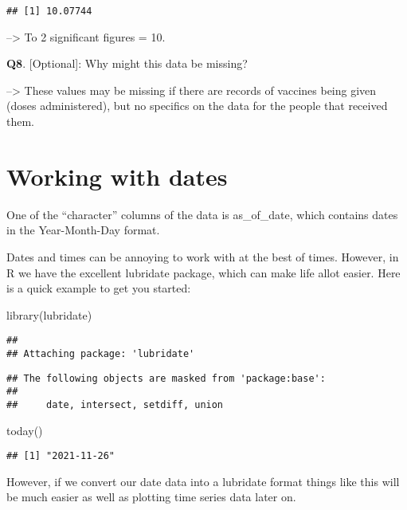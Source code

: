 \documentclass[
]{article}
\newenvironment{Shaded}{\begin{snugshade}}{\end{snugshade}}
\newcommand{\FunctionTok}[1]{\textcolor[rgb]{0.00,0.00,0.00}{#1}}
\newcommand{\NormalTok}[1]{#1}
\begin{document}
\begin{verbatim}
## [1] 10.07744
\end{verbatim}

--\textgreater{} To 2 significant figures = 10.

\textbf{Q8}. {[}Optional{]}: Why might this data be missing?

--\textgreater{} These values may be missing if there are records of
vaccines being given (doses administered), but no specifics on the data
for the people that received them.

\hypertarget{working-with-dates}{%
\section{Working with dates}\label{working-with-dates}}

One of the ``character'' columns of the data is as\_of\_date, which
contains dates in the Year-Month-Day format.

Dates and times can be annoying to work with at the best of times.
However, in R we have the excellent lubridate package, which can make
life allot easier. Here is a quick example to get you started:

\begin{Shaded}
\begin{Highlighting}[]
\FunctionTok{library}\NormalTok{(lubridate)}
\end{Highlighting}
\end{Shaded}

\begin{verbatim}
## 
## Attaching package: 'lubridate'
\end{verbatim}

\begin{verbatim}
## The following objects are masked from 'package:base':
## 
##     date, intersect, setdiff, union
\end{verbatim}

\begin{Shaded}
\begin{Highlighting}[]
\FunctionTok{today}\NormalTok{()}
\end{Highlighting}
\end{Shaded}

\begin{verbatim}
## [1] "2021-11-26"
\end{verbatim}

However, if we convert our date data into a lubridate format things like
this will be much easier as well as plotting time series data later on.
\end{document}
